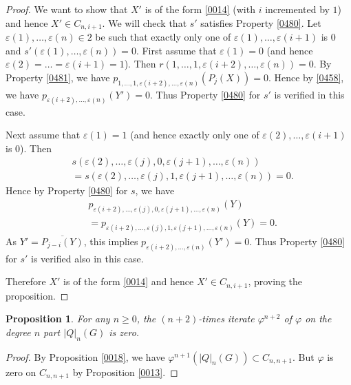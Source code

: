 \documentclass{amsart}
\newtheorem{Prop}[Thm]{Proposition}
\theoremstyle{remark}
\numberwithin{equation}{subsection}
\newcommand{\closure}[1]{\overline{#1}}
\begin{document}
\begin{proof}
	We want to show that $X'$ is of the form \eqref{0014}
	(with $i$ incremented by $1$) and hence $X' \in C_{n, i + 1}$.
	We will check that $s'$ satisfies Property \eqref{0480}.
	Let $\varepsilon(1), \dots, \varepsilon(n) \in 2$ be such that
	exactly only one of $\varepsilon(1), \dots, \varepsilon(i + 1)$ is $0$
	and $s'(\varepsilon(1), \dots, \varepsilon(n)) = 0$.
	First assume that $\varepsilon(1) = 0$
	(and hence $\varepsilon(2) = \dots = \varepsilon(i + 1) = 1$).
	Then $r(1, \dots, 1, \varepsilon(i + 2), \dots, \varepsilon(n)) = 0$.
	By Property \eqref{0481}, we have
	$p_{1, \dots, 1, \varepsilon(i + 2), \dots, \varepsilon(n)}(P_{j}(X)) = 0$.
	Hence by \eqref{0458}, we have
	$p_{\varepsilon(i + 2), \dots, \varepsilon(n)}(Y') = 0$.
	Thus Property \eqref{0480} for $s'$ is verified in this case.
	
	Next assume that $\varepsilon(1) = 1$
	(and hence exactly only one of $\varepsilon(2), \dots, \varepsilon(i + 1)$ is $0$). 
	Then
		\begin{align*}
			&
					s(\varepsilon(2), \dots, \varepsilon(j), 0, \varepsilon(j + 1), \dots, \varepsilon(n))
			\\
			&	=
					s(\varepsilon(2), \dots, \varepsilon(j), 1, \varepsilon(j + 1), \dots, \varepsilon(n))
				=
					0.
		\end{align*}
	Hence by Property \eqref{0480} for $s$, we have
		\begin{align*}
			&
					p_{\varepsilon(i + 2), \dots, \varepsilon(j), 0, \varepsilon(j + 1), \dots, \varepsilon(n)}(Y)
			\\
			&	=
					p_{\varepsilon(i + 2), \dots, \varepsilon(j), 1, \varepsilon(j + 1), \dots, \varepsilon(n)}(Y)
				=
					0.
		\end{align*}
	As $Y' = \closure{P_{j - i}(Y)}$, this implies
	$p_{\varepsilon(i + 2), \dots, \varepsilon(n)}(Y') = 0$.
	Thus Property \eqref{0480} for $s'$ is verified also in this case.
	
	Therefore $X'$ is of the form \eqref{0014} and hence $X' \in C_{n, i + 1}$,
	proving the proposition.
\end{proof}

\begin{Prop} \label{0019}
	For any $n \ge 0$, the $(n + 2)$-times iterate $\varphi^{n + 2}$ of $\varphi$
	on the degree $n$ part $|Q|_{n}(G)$ is zero.
\end{Prop}

\begin{proof}
	By Proposition \ref{0018},
	we have $\varphi^{n + 1}(|Q|_{n}(G)) \subset C_{n, n + 1}$.
	But $\varphi$ is zero on $C_{n, n + 1}$
	by Proposition \ref{0013}.
\end{proof}
\end{document}
